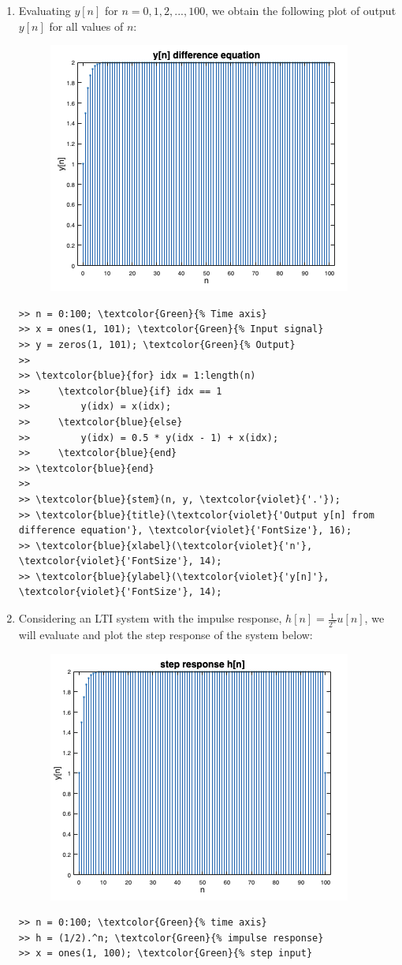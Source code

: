 \documentclass[12pt]{article}
\begin{document}
\begin{enumerate}[label=\textbf{\alph*)}, leftmargin=2.6em]
\item Evaluating $y[n]$ for $n=0,1,2,...,100$, we obtain the following plot of output $y[n]$ for all values of $n$:
\begin{figure}[H]
    \centering
    \includegraphics[width=0.5\linewidth]{plot6.png}
\end{figure}
\begin{Verbatim}[frame=single, commandchars=\\\{\}]
>> n = 0:100; \textcolor{Green}{% Time axis}
>> x = ones(1, 101); \textcolor{Green}{% Input signal}
>> y = zeros(1, 101); \textcolor{Green}{% Output}
>> 
>> \textcolor{blue}{for} idx = 1:length(n)
>>     \textcolor{blue}{if} idx == 1
>>         y(idx) = x(idx);
>>     \textcolor{blue}{else}
>>         y(idx) = 0.5 * y(idx - 1) + x(idx);
>>     \textcolor{blue}{end}
>> \textcolor{blue}{end}
>> 
>> \textcolor{blue}{stem}(n, y, \textcolor{violet}{'.'});
>> \textcolor{blue}{title}(\textcolor{violet}{'Output y[n] from difference equation'}, \textcolor{violet}{'FontSize'}, 16);
>> \textcolor{blue}{xlabel}(\textcolor{violet}{'n'}, \textcolor{violet}{'FontSize'}, 14);
>> \textcolor{blue}{ylabel}(\textcolor{violet}{'y[n]'}, \textcolor{violet}{'FontSize'}, 14);
\end{Verbatim}

\item Considering an LTI system with the impulse response, $h[n]=\frac{1}{2^n}u[n]$, we will evaluate and plot the step response of the system below:
\begin{figure}[H]
    \centering
    \includegraphics[width=0.5\linewidth]{plot7.png}
\end{figure}
\begin{Verbatim}[frame=single, commandchars=\\\{\}]
>> n = 0:100; \textcolor{Green}{% time axis}
>> h = (1/2).^n; \textcolor{Green}{% impulse response}
>> x = ones(1, 100); \textcolor{Green}{% step input}
 

\end{Verbatim}
\end{enumerate}
\end{document}
